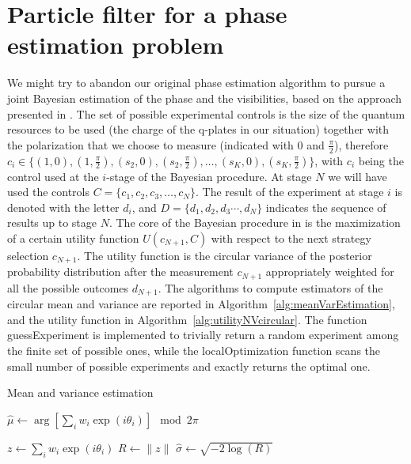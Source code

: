 \documentclass[aps, pra, 10pt, twocolumn, superscriptaddress,floatfix]{revtex4-1}
\newcommand{\norm}[1]{\lVert#1\rVert}
\begin{document}
\section{Particle filter for a phase estimation problem}
%
We might try to abandon our original phase estimation algorithm to pursue a joint Bayesian estimation of the phase and the visibilities, based on the approach presented in \cite{Granade2012}. The set of possible experimental controls is the size of the quantum resources to be used (the charge of the q-plates in our situation) together with the polarization that we choose to measure (indicated with $0$ and $\frac{\pi}{2}$), therefore $c_i \in \lbrace (1, 0), (1, \frac{\pi}{2}) , (s_2, 0), (s_2, \frac{\pi}{2}), \dots, (s_K, 0), (s_K, \frac{\pi}{2}) \rbrace$, with $c_i$ being the control used at the $i$-stage of the Bayesian procedure. At stage $N$ we will have used the controls $C = \lbrace c_1, c_2, c_3, \dots, c_N \rbrace$. The result of the experiment at stage $i$ is denoted with the letter $d_i$, and $D = \lbrace d_1, d_2, d_3 \cdots, d_N \rbrace$ indicates the sequence of results up to stage $N$. The core of the Bayesian procedure in \cite{Granade2012} is the maximization of a certain utility function $U \left( c_{N+1}, C\right)$ with respect to the next strategy selection $c_{N+1}$. The utility function is the circular variance of the posterior probability distribution after the measurement $c_{N+1}$ appropriately weighted for all the possible outcomes $d_{N+1}$. The algorithms to compute estimators of the circular mean and variance are reported in Algorithm~\ref{alg:meanVarEstimation}, and the utility function in Algorithm~\ref{alg:utilityNVcircular}. The function guessExperiment is implemented to trivially return a random experiment among the finite set of possible ones, while the localOptimization function scans the small number of possible experiments and exactly returns the optimal one.
%
\begin{algorithm}[H]
	\caption{Mean and variance estimation}
	\label{alg:meanVarEstimation}
	\begin{algorithmic}[1]
		\State \Return $\hat{\mu} \gets  \arg \left[ \sum_i w_i \exp(i \theta_i) \right] \mod 2 \pi$
		\EndFunction
	\end{algorithmic}
	
	\begin{algorithmic}[1]
		\State $z \gets \sum_i w_i \exp(i \theta_i)$ 
		\State $R \gets \norm{z}$
		\State \Return $\hat{\sigma} \gets \sqrt{-2 \log(R)}$
		\EndFunction
	\end{algorithmic}
\end{algorithm}
\end{document}
